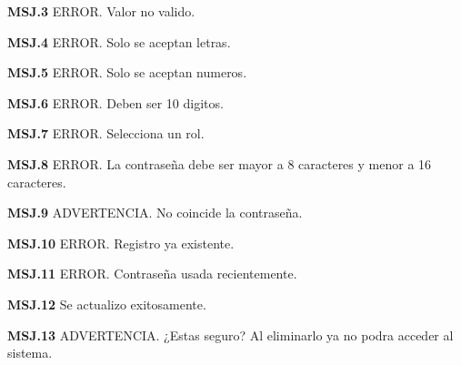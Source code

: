	\begin{Citemize}
	\item {\bf MSJ.3} ERROR. Valor no valido.
	\end{Citemize}
	
	\begin{Citemize}
	\item {\bf MSJ.4} ERROR. Solo se aceptan letras.
	\end{Citemize}
	
	\begin{Citemize}
	\item {\bf MSJ.5} ERROR. Solo se aceptan numeros.
	\end{Citemize}
	
	\begin{Citemize}
	\item {\bf MSJ.6} ERROR. Deben ser 10 digitos.
	\end{Citemize}
	
	\begin{Citemize}
	\item {\bf MSJ.7} ERROR. Selecciona un rol.
	\end{Citemize}
	
	\begin{Citemize}
	\item {\bf MSJ.8} ERROR. La contraseña debe ser mayor a 8 caracteres y menor a 16 caracteres.
	\end{Citemize}
	
	\begin{Citemize}
	\item {\bf MSJ.9} ADVERTENCIA. No coincide la contraseña.
	\end{Citemize}
	
	\begin{Citemize}
	\item {\bf MSJ.10} ERROR. Registro ya existente.
	\end{Citemize}
	
	\begin{Citemize}
	\item {\bf MSJ.11} ERROR. Contraseña usada recientemente.
	\end{Citemize}
	
	\begin{Citemize}
	\item {\bf MSJ.12} Se actualizo exitosamente.
	\end{Citemize}
	
	\begin{Citemize}
	\item {\bf MSJ.13} ADVERTENCIA. ¿Estas seguro? Al eliminarlo ya no podra acceder al sistema.
	\end{Citemize}
	

